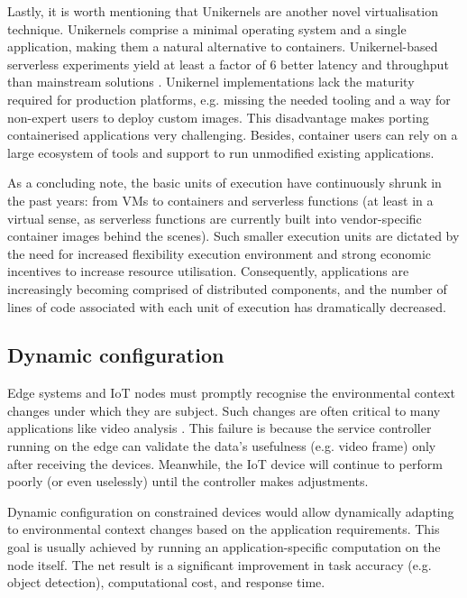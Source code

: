 Lastly, it is worth mentioning that Unikernels \cite{madhavapeddy2013unikernels} are another novel virtualisation technique. Unikernels comprise a minimal operating system and a single application, making them a natural alternative to containers. Unikernel-based serverless experiments yield at least a factor of 6 better latency and throughput than mainstream solutions \cite{koller2017will}. Unikernel implementations lack the maturity required for production platforms, e.g. missing the needed tooling and a way for non-expert users to deploy custom images. This disadvantage makes porting containerised applications very challenging. Besides, container users can rely on a large ecosystem of tools and support to run unmodified existing applications.

As a concluding note, the basic units of execution have continuously shrunk in the past years: from VMs to containers and serverless functions (at least in a virtual sense, as serverless functions are currently built into vendor-specific container images behind the scenes). Such smaller execution units are dictated by the need for increased flexibility execution environment and strong economic incentives to increase resource utilisation. Consequently, applications are increasingly becoming comprised of distributed components, and the number of lines of code associated with each unit of execution has dramatically decreased.

\subsection{Dynamic configuration}

Edge systems and IoT nodes must promptly recognise the environmental context changes under which they are subject. Such changes are often critical to many applications like video analysis \cite{jang2018application}. This failure is because the service controller running on the edge can validate the data's usefulness (e.g. video frame) only after receiving the devices. Meanwhile, the IoT device will continue to perform poorly (or even uselessly) until the controller makes adjustments.

Dynamic configuration on constrained devices would allow dynamically adapting to environmental context changes based on the application requirements. This goal is usually achieved by running an application-specific computation on the node itself. The net result is a significant improvement in task accuracy (e.g. object detection), computational cost, and response time.

